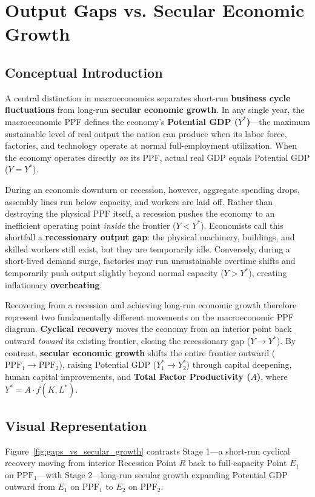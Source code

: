 \documentclass[11pt,letterpaper]{article}
\begin{document}
\section{Output Gaps vs. Secular Economic Growth}

\subsection*{Conceptual Introduction}
A central distinction in macroeconomics separates short-run \textbf{business cycle fluctuations} from long-run \textbf{secular economic growth}. In any single year, the macroeconomic PPF defines the economy's \textbf{Potential GDP ($Y^*$)}—the maximum sustainable level of real output the nation can produce when its labor force, factories, and technology operate at normal full-employment utilization. When the economy operates directly \emph{on} its PPF, actual real GDP equals Potential GDP ($Y = Y^*$).

During an economic downturn or recession, however, aggregate spending drops, assembly lines run below capacity, and workers are laid off. Rather than destroying the physical PPF itself, a recession pushes the economy to an inefficient operating point \emph{inside} the frontier ($Y < Y^*$). Economists call this shortfall a \textbf{recessionary output gap}: the physical machinery, buildings, and skilled workers still exist, but they are temporarily idle. Conversely, during a short-lived demand surge, factories may run unsustainable overtime shifts and temporarily push output slightly beyond normal capacity ($Y > Y^*$), creating inflationary \textbf{overheating}.

Recovering from a recession and achieving long-run economic growth therefore represent two fundamentally different movements on the macroeconomic PPF diagram. \textbf{Cyclical recovery} moves the economy from an interior point back outward \emph{toward} its existing frontier, closing the recessionary gap ($Y \to Y^*$). By contrast, \textbf{secular economic growth} shifts the entire frontier outward ($\text{PPF}_1 \to \text{PPF}_2$), raising Potential GDP ($Y^*_1 \to Y^*_2$) through capital deepening, human capital improvements, and \textbf{Total Factor Productivity ($A$)}, where $Y^* = A \cdot f(K, L^*)$.

\subsection*{Visual Representation}
Figure~\ref{fig:gaps_vs_secular_growth} contrasts Stage 1—a short-run cyclical recovery moving from interior Recession Point $R$ back to full-capacity Point $E_1$ on $\text{PPF}_1$—with Stage 2—long-run secular growth expanding Potential GDP outward from $E_1$ on $\text{PPF}_1$ to $E_2$ on $\text{PPF}_2$.
\end{document}
